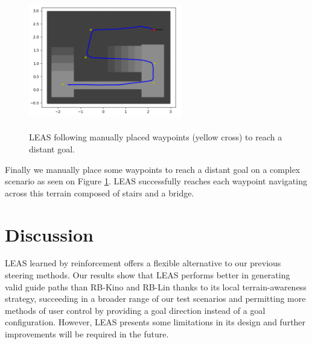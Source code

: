 \begin{figure}
    \centering
    \includegraphics[width=0.6\textwidth, height=6cm]{Figures/Chapter_LEAS/follow_waypoints_bauzil.png}
    \caption{LEAS following manually placed waypoints (yellow cross) to reach a distant goal.}
    \label{fig:bauzil_waypoints}
\end{figure}
Finally we manually place some waypoints to reach a distant goal on a complex scenario as seen on Figure \ref{fig:bauzil_waypoints}. LEAS successfully reaches each waypoint navigating across this terrain composed of stairs and a bridge.



\section{Discussion\label{sub:leas:discussion}}
LEAS learned by reinforcement offers a flexible alternative to our previous steering methods. Our results show that LEAS performs better in generating valid guide paths than RB-Kino and RB-Lin thanks to its local terrain-awareness strategy, succeeding in a broader range of our test scenarios and permitting more methods of user control by providing a goal direction instead of a goal configuration. However, LEAS presents some limitations in its design and further improvements will be required in the future.

